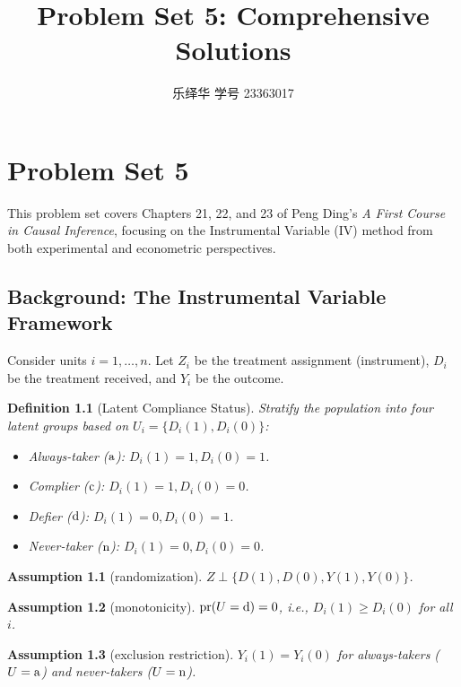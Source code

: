 \documentclass[krantz1]{krantz}
\title{Problem Set 5: Comprehensive Solutions}
\author{乐绎华 学号 23363017}
\newtheorem{definition}{Definition}
\newtheorem{assumption}{Assumption}[chapter]
\def\pr{\textup{pr}}
\def\ind{\perp}
\def\at{\textup{a}}
\def\cp{\textup{c}}
\def\df{\textup{d}}
\def\nt{\textup{n}}
\begin{document}
\maketitle

\chapter{Problem Set 5}

This problem set covers Chapters 21, 22, and 23 of Peng Ding's \textit{A First Course in Causal Inference}, focusing on the Instrumental Variable (IV) method from both experimental and econometric perspectives.

\section{Background: The Instrumental Variable Framework}

Consider units $i=1, \dots, n$. Let $Z_i$ be the treatment assignment (instrument), $D_i$ be the treatment received, and $Y_i$ be the outcome. 

\begin{definition}[Latent Compliance Status]\label{def::compliance}
Stratify the population into four latent groups based on $U_i = \{D_i(1), D_i(0)\}$:
\begin{itemize}
    \item Always-taker ($\at$): $D_i(1)=1, D_i(0)=1$.
    \item Complier ($\cp$): $D_i(1)=1, D_i(0)=0$.
    \item Defier ($\df$): $D_i(1)=0, D_i(0)=1$.
    \item Never-taker ($\nt$): $D_i(1)=0, D_i(0)=0$.
\end{itemize}
\end{definition}

\begin{assumption}[randomization]\label{21.1}
$Z \ind \{D(1), D(0), Y(1), Y(0)\}$.
\end{assumption}

\begin{assumption}[monotonicity]\label{21.2}
$\pr(U = \df) = 0$, i.e., $D_i(1) \ge D_i(0)$ for all $i$.
\end{assumption}

\begin{assumption}[exclusion restriction]\label{21.3}
$Y_i(1) = Y_i(0)$ for always-takers ($U=\at$) and never-takers ($U=\nt$).
\end{assumption}
\end{document}
